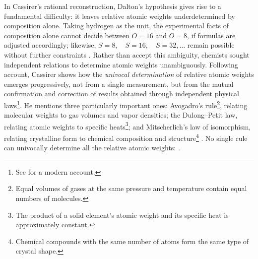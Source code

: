 \documentclass[submitted,12pt]{article}
\begin{document}
In Cassirer's rational reconstruction, Dalton's hypothesis gives rise to a fundamental difficulty: it leaves relative atomic weights underdetermined by composition alone. Taking hydrogen as the unit, the experimental facts of composition alone cannot decide between $O=16$ and $O=8$, if formulas are adjusted accordingly; likewise, $S=8, \quad S=16, \quad S=32, \ldots$ remain possible without further constraints . Rather than accept this ambiguity, chemists sought independent relations to determine atomic weights unambiguously. Following  account, Cassirer shows how the \emph{univocal determination} of relative atomic weights emerges progressively, not from a single measurement, but from the mutual confirmation and correction of results obtained through independent physical laws\footnote{See \cite{Norton2024} for a modern account.}. He mentions three particularly important ones: Avogadro's rule\footnote{Equal volumes of gases at the same pressure and temperature contain equal numbers of molecules.}, relating molecular weights to gas volumes and vapor densities; the Dulong--Petit law, relating atomic weights to specific heats\footnote{The product of a solid element's atomic weight and its specific heat is approximately constant.}; and Mitscherlich's law of isomorphism, relating crystalline form to chemical composition and structure\footnote{Chemical compounds with the same number of atoms form the same type of crystal shape.} . No single rule can univocally determine all the relative atomic weights:  .

\end{document}
